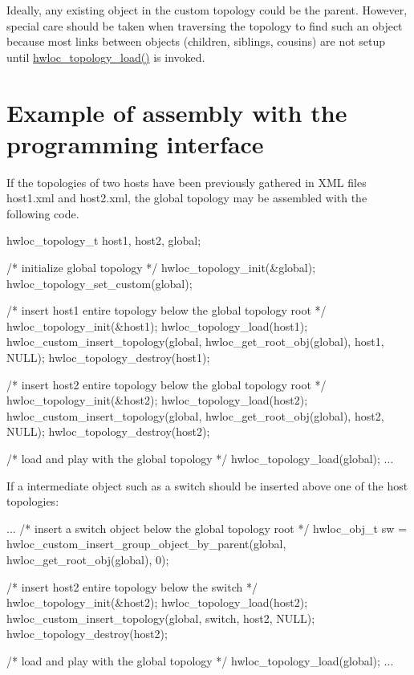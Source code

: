 Ideally, any existing object in the custom topology could be the parent. However, special care should be taken when traversing the topology to find such an object because most links between objects (children, siblings, cousins) are not setup until \hyperlink{a00043_ga91e2e6427b95fb7339c99dbbef996e71}{hwloc\_\-topology\_\-load()} is invoked.\hypertarget{a00006_multinode_example}{}\section{Example of assembly with the programming interface}\label{a00006_multinode_example}
If the topologies of two hosts have been previously gathered in XML files {\ttfamily host1.xml} and {\ttfamily host2.xml}, the global topology may be assembled with the following code.

\begin{DoxyVerb}
hwloc_topology_t host1, host2, global;

/* initialize global topology */
hwloc_topology_init(&global);
hwloc_topology_set_custom(global);

/* insert host1 entire topology below the global topology root */
hwloc_topology_init(&host1);
hwloc_topology_load(host1);
hwloc_custom_insert_topology(global, hwloc_get_root_obj(global),
                             host1, NULL);
hwloc_topology_destroy(host1);

/* insert host2 entire topology below the global topology root */
hwloc_topology_init(&host2);
hwloc_topology_load(host2);
hwloc_custom_insert_topology(global, hwloc_get_root_obj(global),
                             host2, NULL);
hwloc_topology_destroy(host2);

/* load and play with the global topology */
hwloc_topology_load(global);
...
\end{DoxyVerb}


If a intermediate object such as a switch should be inserted above one of the host topologies: \begin{DoxyVerb}
...
/* insert a switch object below the global topology root */
hwloc_obj_t sw =
   hwloc_custom_insert_group_object_by_parent(global,
                              hwloc_get_root_obj(global), 0);

/* insert host2 entire topology below the switch */
hwloc_topology_init(&host2);
hwloc_topology_load(host2);
hwloc_custom_insert_topology(global, switch, host2, NULL);
hwloc_topology_destroy(host2);

/* load and play with the global topology */
hwloc_topology_load(global);
...
\end{DoxyVerb}
 